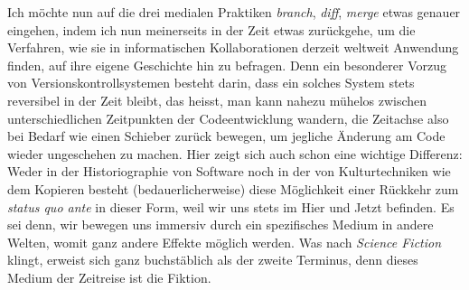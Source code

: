 \documentclass[a4paper,11pt]{article}
\begin{document}
Ich möchte nun auf die drei medialen Praktiken \emph{branch}, \emph{diff}, \emph{merge} etwas genauer eingehen, indem ich nun meinerseits in der Zeit etwas zurückgehe, um die Verfahren, wie sie in informatischen Kollaborationen derzeit weltweit Anwendung finden, auf ihre eigene Geschichte hin zu befragen. Denn ein besonderer Vorzug von Versionskontrollsystemen besteht darin, dass ein solches System stets reversibel in der Zeit bleibt, das heisst, man kann nahezu mühelos zwischen unterschiedlichen Zeitpunkten der Codeentwicklung wandern, die Zeitachse also bei Bedarf wie einen Schieber zurück bewegen, um jegliche Änderung am Code wieder ungeschehen zu machen. Hier zeigt sich auch schon eine wichtige Differenz: Weder in der Historiographie von Software noch in der von Kulturtechniken wie dem Kopieren besteht (bedauerlicherweise) diese Möglichkeit einer Rückkehr zum \emph{status quo ante} in dieser Form, weil wir uns stets im Hier und Jetzt befinden. Es sei denn, wir bewegen uns immersiv durch ein spezifisches Medium in andere Welten, womit ganz andere Effekte möglich werden. Was nach \emph{Science Fiction} klingt, erweist sich ganz buchstäblich als der zweite Terminus, denn dieses Medium der Zeitreise ist die Fiktion.


\begin{comment}

Von der kurzen Geschichte der Sofware zur langen Geschichte der kollektiven Autorschaft. 

Konfliktlösung
Vorteil: Das Zurückgehen in der Zeit. 

Graphentheoretische Darstellung. Beispiel. Briefroman Gefährliche Liebschaften
Source Control. Kontrolle behalten über die Quellen. 

Kurze Erklärung anhand von \verb+https://en.wikipedia.org/wiki/Version_control+


Interessant: Statt single und zentralisiert, gibt's das System noch als \verb+https://en.wikipedia.org/wiki/Distributed_version_control+

\verb+https://en.wikipedia.org/wiki/Comparison_of_version_control_software#History_and_adoption+

\end{comment}

\end{document}
